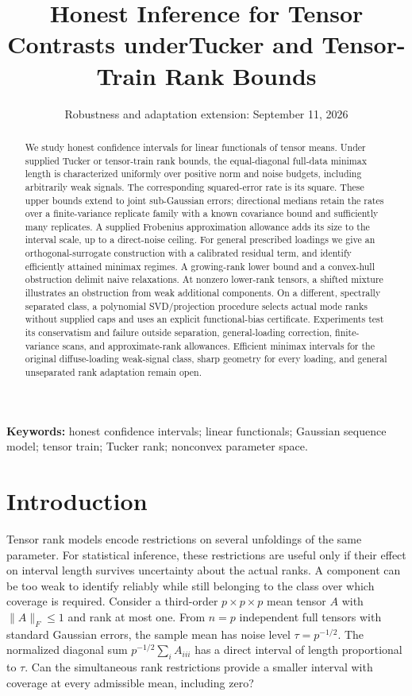 \documentclass[11pt]{article}
\title{Honest Inference for Tensor Contrasts under\newline Tucker and Tensor-Train Rank Bounds}
\author{}
\date{Robustness and adaptation extension: September 11, 2026}
\theoremstyle{remark}
\newcommand{\norm}[1]{\lVert #1\rVert}
\begin{document}
\maketitle

\begin{abstract}
We study honest confidence intervals for linear functionals of tensor means. Under supplied Tucker or tensor-train rank bounds, the equal-diagonal full-data minimax length is characterized uniformly over positive norm and noise budgets, including arbitrarily weak signals. The corresponding squared-error rate is its square. These upper bounds extend to joint sub-Gaussian errors; directional medians retain the rates over a finite-variance replicate family with a known covariance bound and sufficiently many replicates. A supplied Frobenius approximation allowance adds its size to the interval scale, up to a direct-noise ceiling. For general prescribed loadings we give an orthogonal-surrogate construction with a calibrated residual term, and identify efficiently attained minimax regimes. A growing-rank lower bound and a convex-hull obstruction delimit naive relaxations. At nonzero lower-rank tensors, a shifted mixture illustrates an obstruction from weak additional components. On a different, spectrally separated class, a polynomial SVD/projection procedure selects actual mode ranks without supplied caps and uses an explicit functional-bias certificate. Experiments test its conservatism and failure outside separation, general-loading correction, finite-variance scans, and approximate-rank allowances. Efficient minimax intervals for the original diffuse-loading weak-signal class, sharp geometry for every loading, and general unseparated rank adaptation remain open.
\end{abstract}

\noindent\textbf{Keywords:} honest confidence intervals; linear functionals; Gaussian sequence model; tensor train; Tucker rank; nonconvex parameter space.

\section{Introduction}\label{sec:intro}

Tensor rank models encode restrictions on several unfoldings of the same parameter. For statistical inference, these restrictions are useful only if their effect on interval length survives uncertainty about the actual ranks. A component can be too weak to identify reliably while still belonging to the class over which coverage is required. Consider a third-order $p\times p\times p$ mean tensor $A$ with $\norm A_F\le1$ and rank at most one. From $n=p$ independent full tensors with standard Gaussian errors, the sample mean has noise level $\tau=p^{-1/2}$. The normalized diagonal sum $p^{-1/2}\sum_i A_{iii}$ has a direct interval of length proportional to $\tau$. Can the simultaneous rank restrictions provide a smaller interval with coverage at every admissible mean, including zero?
\end{document}
